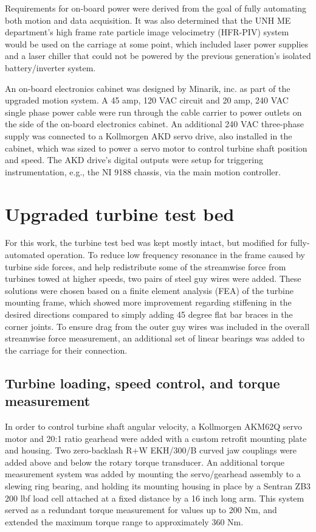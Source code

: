 Requirements for on-board power were derived from the goal of fully automating
both motion and data acquisition. It was also determined that the UNH ME
department's high frame rate particle image velocimetry (HFR-PIV) system would
be used on the carriage at some point, which included laser power supplies and a
laser chiller that could not be powered by the previous generation's isolated
battery/inverter system. 

An on-board electronics cabinet was designed by Minarik, inc. as part of the
upgraded motion system. A 45 amp, 120 VAC circuit and 20 amp, 240 VAC single
phase power cable were run through the cable carrier to power outlets on the
side of the on-board electronics cabinet. An additional 240 VAC three-phase
supply was connected to a Kollmorgen AKD servo drive, also installed in the
cabinet, which was sized to power a servo motor to control turbine shaft
position and speed. The AKD drive's digital outputs were setup for triggering
instrumentation, e.g., the NI 9188 chassis, via the main motion controller.


\section{Upgraded turbine test bed}

For this work, the turbine test bed was kept mostly intact, but modified for
fully-automated operation. To reduce low frequency resonance in the frame caused
by turbine side forces, and help redistribute some of the streamwise force from
turbines towed at higher speeds, two pairs of steel guy wires were added. These
solutions were chosen based on a finite element analysis (FEA) of the turbine
mounting frame, which showed more improvement regarding stiffening in the
desired directions compared to simply adding 45 degree flat bar braces in the
corner joints. To ensure drag from the outer guy wires was included in the
overall streamwise force measurement, an additional set of linear bearings was
added to the carriage for their connection.


\subsection{Turbine loading, speed control, and torque measurement}

In order to control turbine shaft angular velocity, a Kollmorgen AKM62Q servo
motor and 20:1 ratio gearhead were added with a custom retrofit mounting plate
and housing. Two zero-backlash R+W EKH/300/B curved jaw couplings were added
above and below the rotary torque transducer. An additional torque measurement
system was added by mounting the servo/gearhead assembly to a slewing ring
bearing, and holding its mounting housing in place by a Sentran ZB3 200 lbf load
cell attached at a fixed distance by a 16 inch long arm. This system served as a
redundant torque measurement for values up to 200 Nm, and extended the maximum
torque range to approximately 360 Nm.

